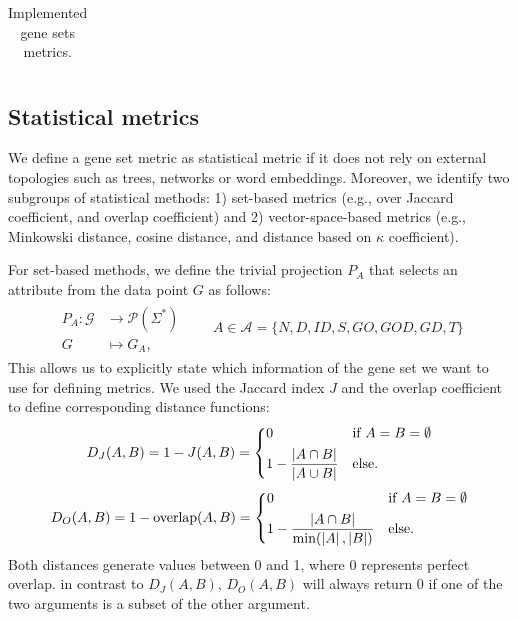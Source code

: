 \documentclass{thesisclass}
\DeclareMathOperator{\overlap}{overlap}
\DeclareMathOperator{\wToV}{w2v}
\begin{document}
\begin{table}[!h]
\begin{tabularx}{\linewidth}{l|X}
		\hline
	\end{tabularx}
	\caption{Implemented gene sets metrics.}
	\label{fig:metrics}
\end{table}

\subsection{Statistical metrics}

We define a gene set metric as statistical metric if it does not rely on external topologies such as trees, networks or word embeddings. Moreover, we identify two subgroups of statistical methods: 1) set-based metrics (e.g., over Jaccard coefficient, and overlap coefficient) and 2) vector-space-based metrics (e.g., Minkowski distance, cosine distance, and distance based on $\kappa$ coefficient).

For set-based methods, we define the trivial projection $P_A$ that selects an attribute from the data point $G$ as follows:
\begin{align} \label{eq:trivial_projection}
	\begin{split}
		P_A : \mathcal{G} & \to \mathcal{P}(\Sigma^*) \\
		G & \mapsto  G_A,
	\end{split} \qquad A \in \mathcal{A} = \lbrace{ N,D, ID, S,GO, GOD, GD,T \rbrace}
\end{align}
This allows us to explicitly state which information of the gene set we want to use for defining metrics.
We used the Jaccard index $J$ and the overlap coefficient~\cite{Vijaymeena} to define corresponding distance functions:
\begin{align}
	D_J(A,B) = 1-J(A,B) =\begin{dcases}
			0 & \text{if } A=B=\emptyset \\
			1 - \frac{\left| A \cap B \right|}{\left| A \cup B \right|}  &\text{else}.
		\end{dcases}
\end{align}
\begin{align}
	D_O(A,B) = 1- \overlap(A,B) = \begin{dcases}
					0 & \text{if } A=B=\emptyset \\
					1 - \frac{\left| A \cap B \right|}{\min(\left| A \right|, \left| B \right|)} &\text{else}.
				\end{dcases}
\end{align}
Both distances generate values between 0 and 1, where 0 represents perfect overlap. in contrast to $D_J(A,B)$, $D_O(A,B)$ will always return 0 if one of the two arguments is a subset of the other argument.
\end{document}
